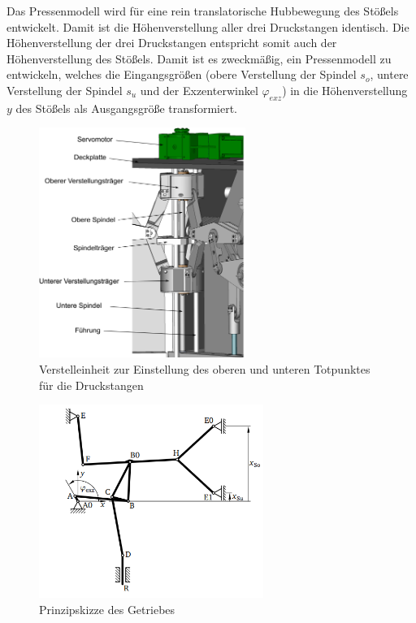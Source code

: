 Das Pressenmodell wird für eine rein translatorische Hubbewegung des Stößels entwickelt. Damit ist die Höhenverstellung aller drei Druckstangen identisch. Die Höhenverstellung der drei Druckstangen entspricht somit auch der Höhenverstellung des Stößels. 
Damit ist es zweckmäßig, ein Pressenmodell zu entwickeln, welches die Eingangsgrößen (obere Verstellung der Spindel $s_o$, untere Verstellung der Spindel $s_u$ und der Exzenterwinkel $\varphi_{exz}$) in die Höhenverstellung $y$ des Stößels als Ausgangsgröße transformiert. 

\begin{figure} [H]
	\centering
	\includegraphics[width=0.6\textwidth]{images/verstelleinheit}
	\caption{Verstelleinheit zur Einstellung des oberen und unteren Totpunktes für die Druckstangen \cite{Rakowitsch.2018}}
	\label{fig:verstelleinheit}
\end{figure}

\begin{figure} [H]
	\centering
	\includegraphics[width=0.65\textwidth]{images/prinzipskizze}
	\caption{Prinzipskizze des Getriebes \cite{Rakowitsch.2018}}
	\label{fig:prinzipskizze}
\end{figure}


